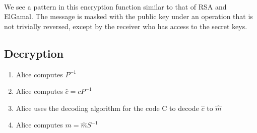 \documentclass{article}
\theoremstyle{definition}
\begin{document}
	\paragraph{} We see a pattern in this encryption function similar to that of RSA and ElGamal.  The message is masked with the public key under an operation that is not trivially reversed, except by the receiver who has access to the secret keys.
	
	\subsection{Decryption}
	\begin{enumerate}[1)]
	\item Alice computes $P^{-1}$
	\item Alice computes ${\hat c} = cP^{-1}$
	\item Alice uses the decoding algorithm for the code C to decode ${\hat c}$ to ${\hat m}$
	\item Alice computes $m = {\hat m}S^{-1}$
	\end{enumerate}
\end{document}
